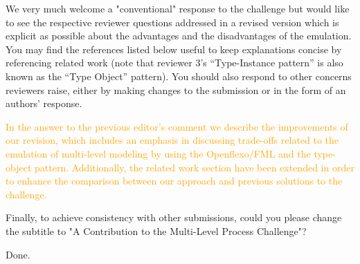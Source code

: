 \documentclass[10pt]{article}
\begin{document}
\begin{response}{We very much welcome a "conventional" response to the challenge but would like to see the respective reviewer questions addressed in a revised version which is explicit as possible about the advantages and the disadvantages of the emulation. You may find the references listed below useful to keep explanations concise by referencing related work (note that reviewer 3’s “Type-Instance pattern” is also known as the “Type Object” pattern). You should also respond to other concerns reviewers raise, either by making changes to the submission or in the form of an authors' response.} 

\textcolor{orange}{In the answer to the previous editor's comment we describe the improvements of our revision, which includes an emphasis in discussing trade-offs related to the emulation of multi-level modeling by using the Openflexo/FML and the type-object pattern. Additionally, the related work section have been extended in order to enhance the comparison between our approach and previous solutions to the challenge.}

\end{response}


\begin{response}{Finally, to achieve consistency with other submissions, could you please change the subtitle to "A Contribution to the Multi-Level Process Challenge"?}

Done.
\end{response}

\pagebreak
\end{document}
